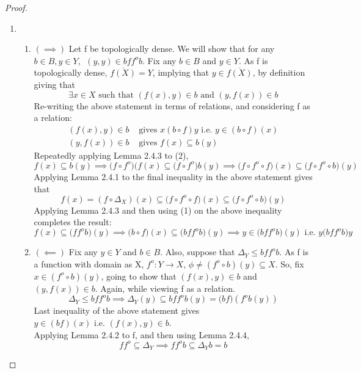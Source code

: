 \documentclass[18pt,a4paper]{article}
\theoremstyle{definition}
\begin{document}
\begin{proof}
\begin{enumerate}[label=(\alph*)]
\begin{enumerate}[label=(\roman*)]
			\end{enumerate}
		\item \begin{enumerate}[label=(\roman*)]
			\item $(\implies)$ Let f be topologically dense. We will show that
				for any $b\in B, y \in Y$, $\;(y,y) \in bff^ob$. Fix any $ b\in B$ and
				$y \in Y$. As f is topologically dense, $\overline{f(X)}=Y $, implying
				that $y\in \overline{f(X)}$, by definition giving that
				\[ \exists x\in X \text{ such that }
				(f(x),y) \in b \text{ and } (y,f(x)) \in b \]
				Re-writing the above statement in terms of relations, and
				considering f as a relation:
				\begin{align}
					(f(x),y) \in b &\text{ gives }  x(b \circ f)y \text{ i.e. }
					y \in (b \circ f)(x)\\
					(y,f(x)) \in b &\text{ gives } f(x)\subseteq b(y)
				\end{align}
				Repeatedly applying Lemma 2.4.3 to (2),
				\[ f(x) \subseteq b(y) \implies
					\big(f \circ f^o \big)(f(x) \subseteq \big(f \circ f^o \big)b(y)
					\implies \big(f \circ f^o \circ f\big)(x) \subseteq
				\big(f \circ f^o \circ b \big)(y)\]
				Applying Lemma 2.4.1 to the final inequality
				in the above statement gives that
				\[f(x)= (f\circ  \Delta_X) (x)
					\subseteq \big(f \circ f^o \circ f\big)(x) \subseteq
				\big(f \circ f^o \circ b \big)(y)  \]
				Applying Lemma 2.4.3 and then using (1) on the above inequality completes the result:
				\[ f(x) \subseteq \big(ff^ob \big)(y)
					\implies \big(b \circ f\big)(x) \subseteq
				\big(bff^ob \big)(y) \implies y \in \big(bff^ob \big)(y) \text{ i.e. } y\big(bff^ob \big)y   \]
			\item $(\impliedby)$ Fix any $y \in Y$ and $b \in B$. Also, suppose that
				$\Delta_Y \leq bff^o b$. As f is a function with domain as X,
				$f^o :Y \to X$, $\phi \neq (f^o \circ b)(y)
				\subseteq  X$. So, fix $x\in (f^o \circ b)(y)$, going to show that
				$(f(x),y)\in b$	and $(y,f(x)) \in b$. Again, while viewing f as a
				relation.
				\[ \Delta_Y \leq bff^ob
					\implies \Delta_Y(y) \subseteq bf f^o b(y)=\big(bf\big)
				(f^o b(y))\]
				Last inequality of the above statement gives $y \in (bf)(x)
				\text{ i.e. } (f(x),y)\in b $.\\
				Applying Lemma 2.4.2 to f, and then using Lemma 2.4.4,
				\begin{equation*}
					ff^o  \subseteq \Delta_Y \implies f f^o b \subseteq \Delta_Yb=b
				\end{equation*}

\end{enumerate}
\end{enumerate}
\end{proof}
\end{document}
